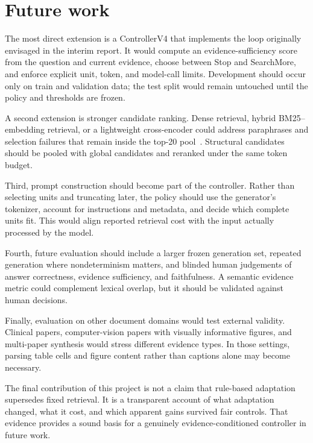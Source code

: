 \section{Future work}

The most direct extension is a ControllerV4 that implements the loop originally envisaged in the interim report. It would compute an evidence-sufficiency score from the question and current evidence, choose between Stop and SearchMore, and enforce explicit unit, token, and model-call limits. Development should occur only on train and validation data; the test split would remain untouched until the policy and thresholds are frozen.

A second extension is stronger candidate ranking. Dense retrieval, hybrid BM25--embedding retrieval, or a lightweight cross-encoder could address paraphrases and selection failures that remain inside the top-20 pool~\cite{karpukhin2020dpr,reimers2019sbert,khattab2020colbert}. Structural candidates should be pooled with global candidates and reranked under the same token budget.

Third, prompt construction should become part of the controller. Rather than selecting units and truncating later, the policy should use the generator's tokenizer, account for instructions and metadata, and decide which complete units fit. This would align reported retrieval cost with the input actually processed by the model.

Fourth, future evaluation should include a larger frozen generation set, repeated generation where nondeterminism matters, and blinded human judgements of answer correctness, evidence sufficiency, and faithfulness. A semantic evidence metric could complement lexical overlap, but it should be validated against human decisions.

Finally, evaluation on other document domains would test external validity. Clinical papers, computer-vision papers with visually informative figures, and multi-paper synthesis would stress different evidence types. In those settings, parsing table cells and figure content rather than captions alone may become necessary.

The final contribution of this project is not a claim that rule-based adaptation supersedes fixed retrieval. It is a transparent account of what adaptation changed, what it cost, and which apparent gains survived fair controls. That evidence provides a sound basis for a genuinely evidence-conditioned controller in future work.


